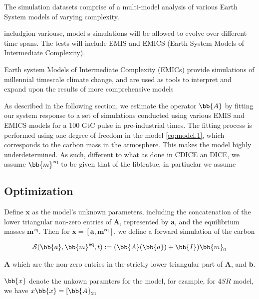 The simulation datasets comprise of a multi-model analysis of various Earth System models of varying complexity. 


 includgion variouse, model s simulations will be allowed to evolve over different time spans. The tests will include EMIS and EMICS (Earth System Models of Intermediate Complexity).



Earth system Models of Intermediate Complexity (EMICs) provide simulations of millennial timescale climate change, and are
used as tools to interpret and expand upon the results of more
comprehensive models



\newpage
As described in the following section, we estimate the operator $\bb{A}$ by fitting our system response to a set of simulations conducted using various EMIS and EMICS models for a 100 GtC pulse in pre-industrial times. The fitting process is performed using one degree of freedom in the model \eqref{eq:model.1}, which corresponds to the carbon mass in the atmosphere. This makes the model highly underdetermined. As such, different to what as done in CDICE an DICE, we assume $\bb{m}^{\text{eq}}$ to be given that of the libtratue, in partiuclar we assume  

\newpage
\subsection{Optimization} 
Define $\mathbf{x}$ as the model's unknown parameters, including the concatenation of the lower triangular non-zero entries of $\mathbf{A}$, represented by $\mathbf{a}$, and the equilibrium masses $\mathbf{m}^{\text{eq}}$. Then for $\mathbf{x}=[\mathbf{a},\mathbf{m}^{\text{eq}}]$, we define a forward simulation of the carbon 

\begin{align}
	\mathcal{S}(\bb{a},\bb{m}^{\text{eq}},t) := (\bb{A}(\bb{a})  + \bb{I})\bb{m}_0
\end{align}




 $\mathbf{A}$ which are the non-zero entries in the strictly lower triangular part of $\mathbf{A}$, and $\mathbf{b}$.



$\bb{x}$ denote the unkown paramters for the model, for ezample, for $4SR$ model, we have  $x\bb{x}=[\bb{A}_{21}$






